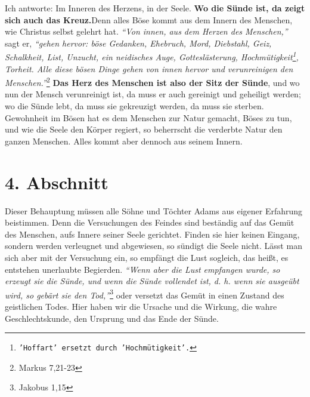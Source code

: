 \label{ref:03_03_ort_des_kreuzes}
Ich antworte: Im Inneren des Herzens, in der Seele. \textbf{Wo die Sünde ist,
da zeigt
sich auch das Kreuz.}Denn alles Böse kommt aus dem Innern des Menschen, wie
Christus selbst gelehrt hat.
\textit{"`Von innen, aus dem Herzen des Menschen,"'} sagt er,
\textit{"`gehen hervor: böse Gedanken, Ehebruch, Mord, Diebstahl, Geiz,
Schalkheit,
List, Unzucht, ein neidisches Auge, Gotteslästerung,
Hochmütigkeit\footnote{\texttt{'Hoffart' ersetzt durch 'Hochmütigkeit'.}},
Torheit. Alle
diese bösen Dinge gehen von innen hervor und verunreinigen den
Menschen."'}\footnote{Markus 7,21-23}
\textbf{Das Herz des Menschen ist also der Sitz der Sünde},
 und wo nun der Mensch
verunreinigt ist, da muss er auch gereinigt und
geheiligt werden; wo die Sünde lebt, da muss sie gekreuzigt werden, da muss sie
sterben. Gewohnheit im Bösen hat es dem Menschen zur Natur gemacht, Böses zu
tun, und wie die Seele den Körper regiert, so beherrscht die verderbte Natur
den ganzen Menschen. Alles kommt aber dennoch aus seinem Innern.

\section{4. Abschnitt} \label{kap3_ab4}

Dieser Behauptung müssen alle Söhne und Töchter Adams aus eigener Erfahrung
beistimmen. Denn die Versuchungen des Feindes sind beständig auf das Gemüt des
Menschen, aufs Innere seiner Seele gerichtet. Finden sie hier keinen Eingang,
sondern werden verleugnet und abgewiesen, so sündigt die Seele nicht. Lässt man
sich aber mit der Versuchung ein, so empfängt die Lust sogleich, das heißt, es
entstehen unerlaubte Begierden.
\textit{"`Wenn aber die Lust empfangen wurde, so erzeugt
sie die Sünde, und wenn die Sünde vollendet ist, d. h. wenn sie ausgeübt wird,
so gebärt sie den Tod,"'}\footnote{Jakobus 1,15}
oder versetzt das Gemüt in einen
Zustand des geistlichen Todes. Hier haben wir die
Ursache und die Wirkung, die
wahre Geschlechtskunde, den Ursprung und das Ende der Sünde.

\medskip

